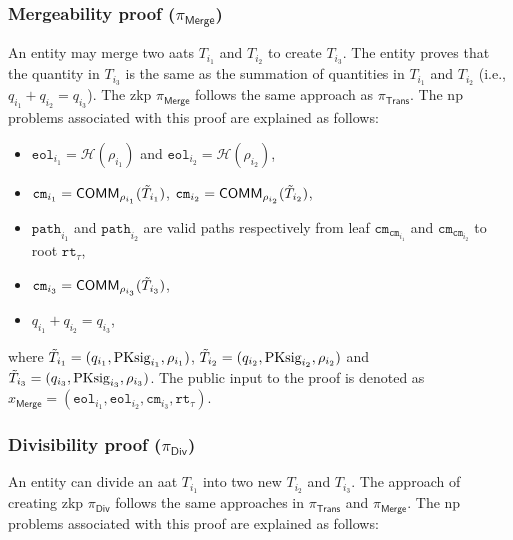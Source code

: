 \subsubsection{Mergeability proof ($\pi_\textsf{Merge}$)}
An entity may merge two \gls{aat}s $T_{i_1}$ and $T_{i_2}$ to create $T_{i_3}$. The entity proves that the quantity in $T_{i_3}$ is the same as the summation of quantities in $T_{i_1}$ and $T_{i_2}$ (i.e., $q_{i_1} + q_{i_2} = q_{i_3}$).  The \gls{zkp} $\pi_\mathsf{Merge}$ follows the same approach as $\pi_\mathsf{Trans}$. The \gls{np} problems associated with this proof are explained as follows:
\begin{itemize}
    \item $\texttt{eol}_{i_1} = \mathcal{H}(\rho_{i_1} )$ and $\texttt{eol}_{i_2} = \mathcal{H}(\rho_{i_2} )$,
	\item $\texttt{cm}_{i_1} = \mathsf{COMM}_{\rho_{i_1}}(\Tilde{T}_{i_1})$, $\texttt{cm}_{i_2} = \mathsf{COMM}_{\rho_{i_2}}(\Tilde{T}_{i_2})$,

	\item $\texttt{path}_{{i_1}}$ and $\texttt{path}_{{i_2}}$  are valid paths respectively from leaf  $\texttt{cm}_{\texttt{cm}_{i_1}}$  and 
      $\texttt{cm}_{\texttt{cm}_{i_2}}$ to root $\texttt{rt}_\tau$,

    \item $\texttt{cm}_{i_3} = \mathsf{COMM}_{\rho_{i_3}}(\Tilde{T}_{i_3})$,
	\item $q_{i_1} + q_{i_2} = q_{i_3} $,
    
\end{itemize}
where  $\Tilde{T}_{i_1} = (q_{i_1}, \text{PKsig}_{i_1}, \rho_{i_1})$, $\Tilde{T}_{i_2} = (q_{i_2}, \text{PKsig}_{i_2}, \rho_{i_2})$ and $\Tilde{T}_{i_3} = (q_{i_3}, \text{PKsig}_{i_3}, \rho_{i_3})$.
The public input to the proof is denoted as $x_\mathsf{Merge} = (\texttt{eol}_{i_{1}}, \texttt{eol}_{i_{2}}, \texttt{cm}_{i_3}, \texttt{rt}_\tau)$.


\subsubsection{Divisibility proof ($\pi_\textsf{Div}$)}
An entity can divide an \gls{aat} $T_{i_1}$ into two new ${T}_{i_2}$ and ${T}_{i_3}$. The approach of creating \gls{zkp} $\pi_\textsf{Div}$ follows the same approaches in $\pi_\textsf{Trans}$ and $\pi_\textsf{Merge}$. The \gls{np} problems associated with this proof are explained as follows:

